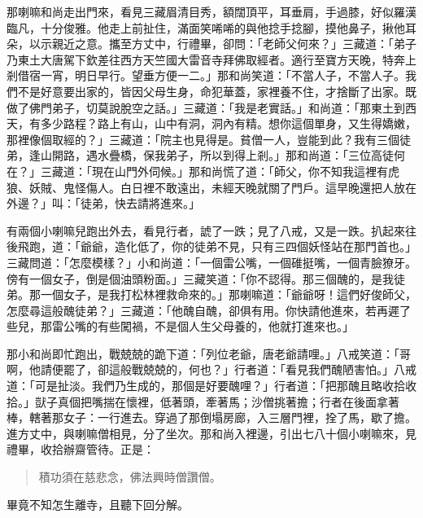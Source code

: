 那喇嘛和尚走出門來，看見三藏眉清目秀，額闊頂平，耳垂肩，手過膝，好似羅漢臨凡，十分俊雅。他走上前扯住，滿面笑唏唏的與他捻手捻腳，摸他鼻子，揪他耳朵，以示親近之意。攜至方丈中，行禮畢，卻問：「老師父何來？」三藏道：「弟子乃東土大唐駕下欽差往西方天竺國大雷音寺拜佛取經者。適行至寶方天晚，特奔上剎借宿一宵，明日早行。望垂方便一二。」那和尚笑道：「不當人子，不當人子。我們不是好意要出家的，皆因父母生身，命犯華蓋，家裡養不住，才捨斷了出家。既做了佛門弟子，切莫說脫空之話。」三藏道：「我是老實話。」和尚道：「那東土到西天，有多少路程？路上有山，山中有洞，洞內有精。想你這個單身，又生得嬌嫩，那裡像個取經的？」三藏道：「院主也見得是。貧僧一人，豈能到此？我有三個徒弟，逢山開路，遇水疊橋，保我弟子，所以到得上剎。」那和尚道：「三位高徒何在？」三藏道：「現在山門外伺候。」那和尚慌了道：「師父，你不知我這裡有虎狼、妖賊、鬼怪傷人。白日裡不敢遠出，未經天晚就關了門戶。這早晚還把人放在外邊？」叫：「徒弟，快去請將進來。」

有兩個小喇嘛兒跑出外去，看見行者，諕了一跌；見了八戒，又是一跌。扒起來往後飛跑，道：「爺爺，造化低了，你的徒弟不見，只有三四個妖怪站在那門首也。」三藏問道：「怎麼模樣？」小和尚道：「一個雷公嘴，一個碓挺嘴，一個青臉獠牙。傍有一個女子，倒是個油頭粉面。」三藏笑道：「你不認得。那三個醜的，是我徒弟。那一個女子，是我打松林裡救命來的。」那喇嘛道：「爺爺呀！這們好俊師父，怎麼尋這般醜徒弟？」三藏道：「他醜自醜，卻俱有用。你快請他進來，若再遲了些兒，那雷公嘴的有些闖禍，不是個人生父母養的，他就打進來也。」

那小和尚即忙跑出，戰兢兢的跪下道：「列位老爺，唐老爺請哩。」八戒笑道：「哥啊，他請便罷了，卻這般戰兢兢的，何也？」行者道：「看見我們醜陋害怕。」八戒道：「可是扯淡。我們乃生成的，那個是好要醜哩？」行者道：「把那醜且略收拾收拾。」獃子真個把嘴揣在懷裡，低著頭，牽著馬；沙僧挑著擔；行者在後面拿著棒，轄著那女子：一行進去。穿過了那倒塌房廊，入三層門裡，拴了馬，歇了擔。進方丈中，與喇嘛僧相見，分了坐次。那和尚入裡邊，引出七八十個小喇嘛來，見禮畢，收拾辦齋管待。正是：
\begin{quote}
積功須在慈悲念，佛法興時僧讚僧。
\end{quote}

畢竟不知怎生離寺，且聽下回分解。
